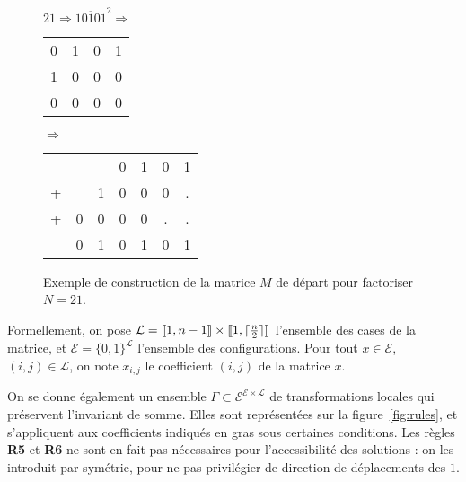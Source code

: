 \documentclass[11pt, openany]{article}
\newcommand{\cg }{[\kern-0.15em [}
\newcommand{\cd}{]\kern-0.15em]}
\newcommand{\La}{\mathcal{L}}
\newcommand{\E}{\mathcal{E}}
\begin{document}
\begin{figure}[h]
\centering

$21 \Rightarrow \overline{10101}^2 \Rightarrow$
\begin{tabular}{cccc}
0&1&0&1\\
1&0&0&0\\
0&0&0&0\\
\end{tabular}
$\Rightarrow$
\begin{tabular}{ccccccc}
&&&0&1&0&1\\
+&&1&0&0&0&.\\
+&0&0&0&0&.&.\\
\hline
&0&1&0&1&0&1\\
\end{tabular}

\caption{Exemple de construction de la matrice $M$ de départ pour factoriser $N=21$.}
\label{fig:init}
\end{figure}

Formellement, on pose $\La=\cg 1, n-1 \cd \times \cg 1, \lceil\frac{n}{2}\rceil\cd$ l'ensemble des cases de la matrice, et $\E=\{0,1\}^\La$ l'ensemble des configurations. Pour tout $x \in \E$, $(i,j)\in\La$, on note $x_{i,j}$ le coefficient $(i,j)$ de la matrice $x$. 

On se donne également un ensemble $\Gamma \subset \E^{\E\times\La}$ de transformations locales qui préservent l'invariant de somme. Elles sont représentées sur la figure~\ref{fig:rules}, et s'appliquent aux coefficients indiqués en gras sous certaines conditions. Les règles \textbf{R5} et \textbf{R6} ne sont en fait pas nécessaires pour l'accessibilité des solutions : on les introduit par symétrie, pour ne pas privilégier de direction de déplacements des $1$. 

\end{document}
